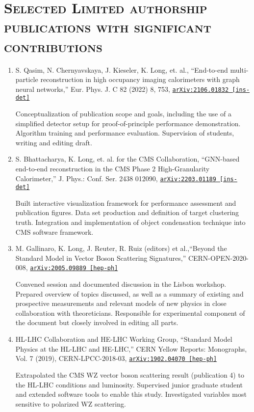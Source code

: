 \documentclass[a4paper]{article}
\begin{document}
\section{\textsc{Selected Limited authorship publications with significant contributions}}
\begin{enumerate}\addtocounter{enumi}{6}
  \item S. Qasim, N. Chernyavskaya, J. Kieseler, K. Long, et. al., ``End-to-end multi-particle reconstruction in high occupancy imaging calorimeters with graph neural networks,'' 
    Eur. Phys. J. C 82 (2022) 8, 753, \href{https://arxiv.org/abs/2106.01832}{\texttt{arXiv:2106.01832 [ins-det]}}

    Conceptualization of publication scope and goals, including the use of a simplified detector setup for proof-of-principle performance demonstration.
    Algorithm training and performance evaluation. Supervision of students, writing and editing draft.

  \item S. Bhattacharya, K. Long, et. al. for the CMS Collaboration, ``GNN-based end-to-end reconstruction in the CMS Phase 2 High-Granularity Calorimeter,'' J. Phys.: Conf. Ser. 2438 012090, \href{https://arxiv.org/abs/2203.01189}{\texttt{arXiv:2203.01189 [ins-det]}} 

    Built interactive visualization framework for performance assessment and publication figures.
    Data set production and definition of target clustering truth. 
    Integration and implementation of object condensation technique into CMS software framework. 
     
  \item M. Gallinaro, K. Long, J. Reuter, R. Ruiz (editors) et al.,``Beyond the Standard Model in Vector Boson Scattering Signatures,''
    CERN-OPEN-2020-008, \href{https://arxiv.org/abs/2005.09889}{\texttt{arXiv:2005.09889 [hep-ph]}}

    Convened session and documented discussion in the Lisbon workshop.
    Prepared overview of topics discussed, as well as a summary of existing and prospective measurements and relevant models of new physics in 
    close collaboration with theoreticians. 
    Responsible for experimental component of the document but closely involved in editing all parts.
  \item HL-LHC Collaboration and HE-LHC Working Group, ``Standard Model Physics at the HL-LHC and HE-LHC,''
    CERN Yellow Reports: Monographs, Vol. 7 (2019), CERN-LPCC-2018-03, \href{https://arxiv.org/abs/1902.04070}{\texttt{arXiv:1902.04070 [hep-ph]}}

    Extrapolated the CMS WZ vector boson scattering result (publication 4) to the HL-LHC conditions and luminosity. Supervised junior
    graduate student and extended software tools to enable this study. Investigated variables most sensitive to 
    polarized WZ scattering.
\end{enumerate}
\end{document}
